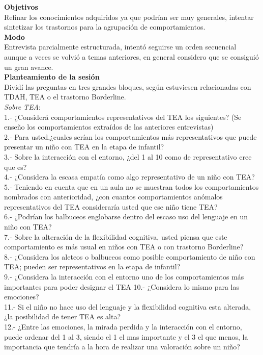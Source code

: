 \documentclass[letterpaper,12pt]{article}
\begin{document}
\textbf{Objetivos} \\
	Refinar los conocimientos adquiridos ya que podrían ser muy generales, intentar sintetizar los trastornos para la agrupación de comportamientos. \\
	
\textbf{Modo} \\
Entrevista parcialmente estructurada, intentó seguirse un orden secuencial aunque a veces se volvió a temas anteriores, en general considero que se consiguió un gran avance. \\

\textbf{Planteamiento de la sesión} \\
Dividí las preguntas en tres grandes bloques, según estuviesen relacionadas con TDAH, TEA o el trastorno Borderline. \\
\textit{Sobre TEA}: \\
1.- ¿Considerá comportamientos representativos del TEA los siguientes? (Se enseño los comportamientos extraídos de las anteriores entrevistas)\\
2.- Para usted,¿cuales serían los comportamientos más representativos que puede presentar un niño con TEA en la etapa de infantil?\\
3.- Sobre la interacción con el entorno, ¿del 1 al 10 como de representativo cree que es?\\
4.- ¿Considera la escasa empatía como algo representativo de un niño con TEA?\\
5.- Teniendo en cuenta que en un aula no se muestran todos los comportamientos nombrados con anterioridad, ¿con cuantos comportamientos anómalos representativos del TEA consideraría usted que ese niño tiene TEA?\\
6.- ¿Podrían los balbuceos englobarse dentro del escaso uso del lenguaje en un niño con TEA?\\
7.- Sobre la alteración de la flexibilidad cognitiva, usted piensa que este comportamiento es más usual en niños con TEA o con trastorno Borderline?\\
8.- ¿Considera los aleteos o balbuceos como posible comportamiento de niño con TEA; pueden ser representativos en la etapa de infantil?\\
9.- ¿Considera la interacción con el entorno uno de los comportamientos más importantes para poder designar el TEA
10.- ¿Considera lo mismo para las emociones?\\
11.- Si el niño no hace uso del lenguaje y la flexibilidad cognitiva esta alterada, ¿la posibilidad de tener TEA es alta?\\
12.- ¿Entre las emociones, la mirada perdida y la interacción con el entorno, puede ordenar del 1 al 3, siendo el 1 el mas importante y el 3 el que menos, la importancia que tendría a la hora de realizar una valoración sobre un niño?\\
\end{document}
